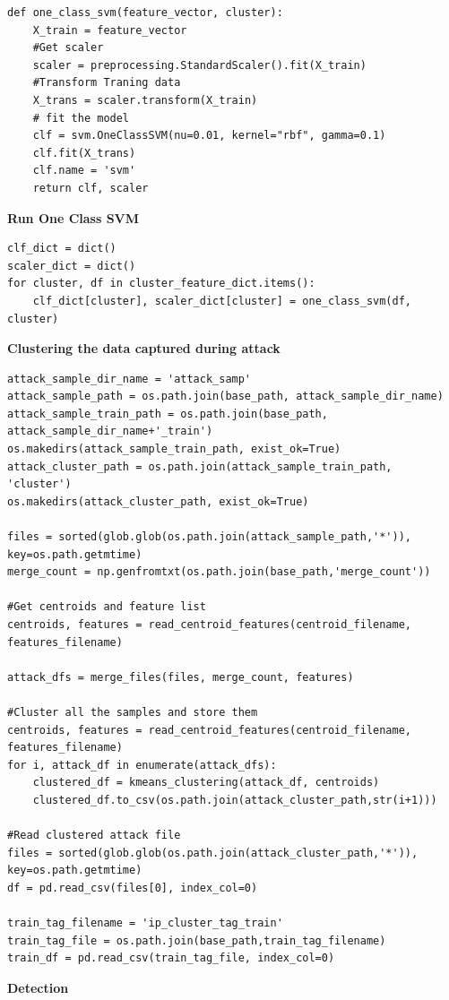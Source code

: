 \documentclass{article}
\begin{document}
\begin{verbatim}
def one_class_svm(feature_vector, cluster):
    X_train = feature_vector
    #Get scaler
    scaler = preprocessing.StandardScaler().fit(X_train)
    #Transform Traning data
    X_trans = scaler.transform(X_train)
    # fit the model
    clf = svm.OneClassSVM(nu=0.01, kernel="rbf", gamma=0.1)
    clf.fit(X_trans)
    clf.name = 'svm'
    return clf, scaler
\end{verbatim}
\textbf{Run One Class SVM}
\begin{verbatim}
clf_dict = dict()
scaler_dict = dict()
for cluster, df in cluster_feature_dict.items():
    clf_dict[cluster], scaler_dict[cluster] = one_class_svm(df, cluster)
\end{verbatim}
\pagebreak
\textbf{\Large{Clustering the data captured during attack}}
\begin{verbatim}
attack_sample_dir_name = 'attack_samp'
attack_sample_path = os.path.join(base_path, attack_sample_dir_name)
attack_sample_train_path = os.path.join(base_path, attack_sample_dir_name+'_train')
os.makedirs(attack_sample_train_path, exist_ok=True)
attack_cluster_path = os.path.join(attack_sample_train_path, 'cluster')
os.makedirs(attack_cluster_path, exist_ok=True)

files = sorted(glob.glob(os.path.join(attack_sample_path,'*')),  key=os.path.getmtime)
merge_count = np.genfromtxt(os.path.join(base_path,'merge_count'))

#Get centroids and feature list
centroids, features = read_centroid_features(centroid_filename, features_filename)

attack_dfs = merge_files(files, merge_count, features)

#Cluster all the samples and store them
centroids, features = read_centroid_features(centroid_filename, features_filename)
for i, attack_df in enumerate(attack_dfs):
    clustered_df = kmeans_clustering(attack_df, centroids)
    clustered_df.to_csv(os.path.join(attack_cluster_path,str(i+1)))

#Read clustered attack file
files = sorted(glob.glob(os.path.join(attack_cluster_path,'*')),  key=os.path.getmtime)
df = pd.read_csv(files[0], index_col=0)

train_tag_filename = 'ip_cluster_tag_train'
train_tag_file = os.path.join(base_path,train_tag_filename)
train_df = pd.read_csv(train_tag_file, index_col=0)
\end{verbatim}
\textbf{\Large{Detection}}
\end{document}
